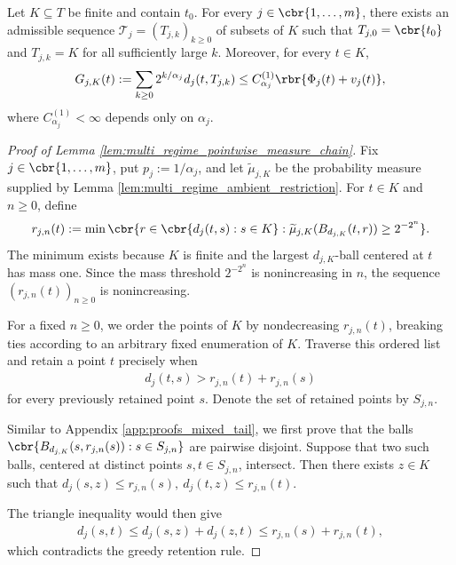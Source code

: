 \documentclass[11pt]{article}
\begin{document}
\begin{lemma}
\label{lem:multi_regime_pointwise_measure_chain}
Let $K\subseteq T$ be finite and contain $t_0$. For every
$j\in\cbr{1,\ldots,m}$, there exists an admissible sequence
$\mathcal T_j=(T_{j,k})_{k\ge0}$ of subsets of $K$ such that
$T_{j,0}=\cbr{t_0}$ and $T_{j,k}=K$ for all sufficiently large $k$.
Moreover, for every $t\in K$,
\begin{align}
G_{j,K}(t)
:=
\sum_{k\ge0}2^{k/\alpha_j}d_j(t,T_{j,k})
\le
C_{\alpha_j}^{(1)}
\rbr{\Phi_j(t)+v_j(t)},
\label{eq:multi_regime_metric_chain_cost}
\end{align}
where $C_{\alpha_j}^{(1)}<\infty$ depends only on $\alpha_j$.
\end{lemma}

\begin{proof}[Proof of Lemma
\ref{lem:multi_regime_pointwise_measure_chain}]
Fix $j\in\cbr{1,\ldots,m}$, put
$p_j:=1/\alpha_j$, and let $\widetilde\mu_{j,K}$ be the probability
measure supplied by Lemma \ref{lem:multi_regime_ambient_restriction}.
For $t\in K$ and $n\ge0$, define
\begin{align*}
r_{j,n}(t)
:=
\min\cbr{
r\in\cbr{d_j(t,s):s\in K}:
\widetilde\mu_{j,K}(B_{d_{j,K}}(t,r))
\ge2^{-2^n}
}.
\end{align*}
The minimum exists because $K$ is finite and the largest
$d_{j,K}$-ball centered at $t$ has mass one. Since the mass threshold
$2^{-2^n}$ is nonincreasing in $n$, the sequence
$(r_{j,n}(t))_{n\ge0}$ is nonincreasing.

For a fixed $n\ge0$, we order the points of $K$ by nondecreasing
$r_{j,n}(t)$, breaking ties according to an arbitrary fixed enumeration
of $K$. Traverse this ordered list and retain a point $t$ precisely when
\begin{align*}
d_j(t,s)
>
r_{j,n}(t)+r_{j,n}(s)
\end{align*}
for every previously retained point $s$. Denote the set of retained
points by $S_{j,n}$.

 Similar to Appendix \ref{app:proofs_mixed_tail}, we first prove that the balls
$\cbr{
B_{d_{j,K}}(s,r_{j,n}(s)):
s\in S_{j,n}
}$
are pairwise disjoint. Suppose that two such balls, centered at distinct
points $s,t\in S_{j,n}$, intersect. Then there exists $z\in K$ such
that
$d_j(s,z)\le r_{j,n}(s),
\ 
d_j(t,z)\le r_{j,n}(t)$.

The triangle inequality would then give
\begin{align*}
d_j(s,t)
\le
d_j(s,z)+d_j(z,t)
\le
r_{j,n}(s)+r_{j,n}(t),
\end{align*}
 which contradicts the greedy retention rule.


\end{proof}
\end{document}
